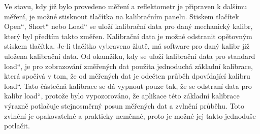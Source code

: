 Ve stavu, kdy již bylo provedeno měření a reflektometr je připraven k dalšímu měření, je možné stisknout tlačítka na kalibračním panelu. Stiskem tlačítek \quotedblbase Open\textquotedblleft, \quotedblbase Short\textquotedblleft{} nebo \quotedblbase Load\textquotedblleft{} se uloží kalibrační data pro daný mechanický kalibr, který byl předtím takto změřen. Kalibrační data je možné odstranit opětovným stiskem tlačítka. Je-li tlačítko vybraveno žlutě, má software pro daný kalibr již uložena kalibrační data. Od okamžiku, kdy se uloží kalibrační data pro standard \quotedblbase load\textquotedblleft , je pro zobrazování změřených dat použita jednoduchá základní kalibrace, která spočívá v tom, že od měřených dat je odečten průběh dpovídající kalibru \quotedblbase load\textquotedblleft . Tato částečná kalibrace se dá vypnout pouze tak, že se odstraní data pro kalibr \quotedblbase load\textquotedblleft , protože bylo vypozorováno, že aplikace této základní kalibrace výrazně potlačuje stejnosměrný posun měřených dat a zvlnění průběhu. Toto zvlnění je opakovatelné a prakticky neměnné, proto je možné jej takto jednoduše potlačit. 